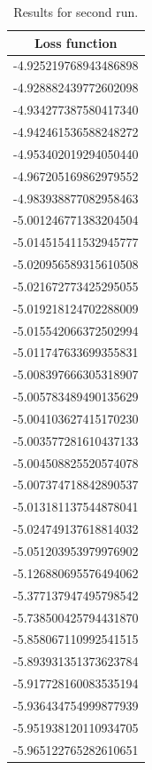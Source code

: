 \documentclass[a4paper]{article}
\begin{document}
\begin{table}[H]
\label{second}
\caption{Results for second run.}
\begin{multicols}{3}
\begin{tabular}{|c|}%
\hline
\bfseries Loss function \\%
\hline
-4.925219768943486898 \\ \hline
-4.928882439772602098 \\ \hline
-4.934277387580417340 \\ \hline
-4.942461536588248272 \\ \hline
-4.953402019294050440 \\ \hline
-4.967205169862979552 \\ \hline
-4.983938877082958463 \\ \hline
-5.001246771383204504 \\ \hline
-5.014515411532945777 \\ \hline
-5.020956589315610508 \\ \hline
-5.021672773425295055 \\ \hline
-5.019218124702288009 \\ \hline
-5.015542066372502994 \\ \hline
-5.011747633699355831 \\ \hline
-5.008397666305318907 \\ \hline
-5.005783489490135629 \\ \hline
-5.004103627415170230 \\ \hline
-5.003577281610437133 \\ \hline
-5.004508825520574078 \\ \hline
-5.007374718842890537 \\ \hline
-5.013181137544878041 \\ \hline
-5.024749137618814032 \\ \hline
-5.051203953979976902 \\ \hline
-5.126880695576494062 \\ \hline
-5.377137947495798542 \\ \hline
-5.738500425794431870 \\ \hline
-5.858067110992541515 \\ \hline
-5.893931351373623784 \\ \hline
-5.917728160083535194 \\ \hline
-5.936434754999877939 \\ \hline
-5.951938120110934705 \\ \hline
-5.965122765282610651 \\ \hline

\end{tabular}
\end{multicols}
\end{table}
\end{document}
